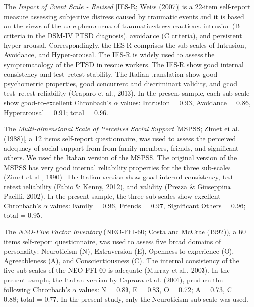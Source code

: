 \documentclass[
  english,
  man,floatsintext]{apa7}
\begin{document}
The \emph{Impact of Event Scale - Revised} {[}IES-R; Weiss (2007){]} is a 22-item self-report measure assessing subjective distress caused by traumatic events and it is based on the views of the core phenomena of traumatic-stress reactions: intrusion (B criteria in the DSM-IV PTSD diagnosis), avoidance (C criteria), and persistent hyper-arousal. Correspondingly, the IES-R comprises the sub-scales of Intrusion, Avoidance, and Hyper-arousal. The IES-R is widely used to assess the symptomatology of the PTSD in rescue workers. The IES-R show good internal consistency and test--retest stability. The Italian translation show good psychometric properties, good concurrent and discriminant validity, and good test--retest reliability (Craparo et al., 2013). In the present sample, each sub-scale show good-to-excellent Chronbach's \(\alpha\) values: Intrusion = 0.93, Avoidance = 0.86, Hyperarousal = 0.91; total = 0.96.

The \emph{Multi-dimensional Scale of Perceived Social Support} {[}MSPSS; Zimet et al. (1988){]}, a 12 items self-report questionnaire, was used to assess the perceived adequacy of social support from from family members, friends, and significant others. We used the Italian version of the MSPSS. The original version of the MSPSS has very good internal reliability properties for the three sub-scales (Zimet et al., 1990). The Italian version show good internal consistency, test--retest reliability (Fabio \& Kenny, 2012), and validity (Prezza \& Giuseppina Pacilli, 2002). In the present sample, the three sub-scales show excellent Chronbach's \(\alpha\) values: Family = 0.96, Friends = 0.97, Significant Others = 0.96; total = 0.95.

The \emph{NEO-Five Factor Inventory} (NEO-FFI-60; Costa and McCrae (1992)), a 60 items self-report questionnaire, was used to assess five broad domains of personality: Neuroticism (N), Extraversion (E), Openness to experience (O), Agreeableness (A), and Conscientiousness (C). The internal consistency of the five sub-scales of the NEO-FFI-60 is adequate (Murray et al., 2003). In the present sample, the Italian version by Caprara et al. (2001), produce the following Chronbach's \(\alpha\) values: N = 0.89, E = 0.83, O = 0.72; A = 0.73, C = 0.88; total = 0.77. In the present study, only the Neuroticism sub-scale was used.
\end{document}
